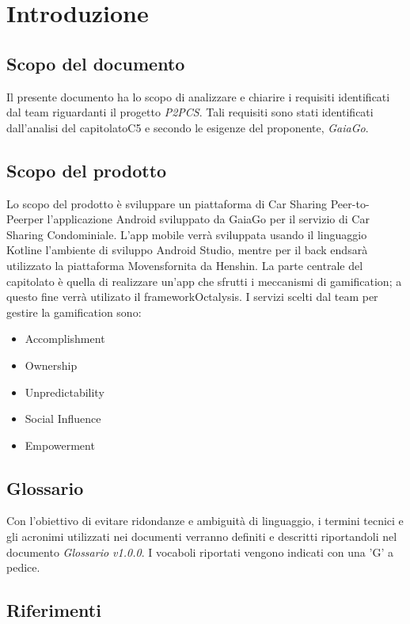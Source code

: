 \section{Introduzione} 
\subsection{Scopo del documento}
Il presente documento ha lo scopo di analizzare e chiarire i requisiti identificati dal team riguardanti il progetto \textit{P2PCS}. Tali requisiti sono stati identificati dall'analisi del capitolato\glosp C5 e secondo le esigenze del proponente, \textit{GaiaGo}.
\subsection{Scopo del prodotto}
Lo scopo del prodotto è sviluppare un piattaforma di Car Sharing Peer-to-Peer\glosp  per l'applicazione Android sviluppato da GaiaGo per il servizio di Car Sharing Condominiale. L'app mobile verrà sviluppata usando il linguaggio Kotlin\glosp e l'ambiente di sviluppo Android Studio, mentre per il back end\glosp sarà utilizzato la piattaforma Movens\glosp fornita da Henshin\glo. La parte centrale del capitolato è quella di realizzare un’app che sfrutti i meccanismi di gamification\glo; a questo fine verrà utilizato il framework\glosp Octalysis\glo. I servizi scelti dal team per gestire la gamification sono:
\begin{itemize}
	\item {Accomplishment}
	\item {Ownership}
	\item {Unpredictability}
	\item {Social Influence}
	\item {Empowerment}
\end{itemize}

\subsection{Glossario}
Con l’obiettivo di evitare ridondanze e ambiguità di linguaggio, i termini tecnici e gli acronimi utilizzati nei documenti verranno definiti e descritti riportandoli nel documento \textit{Glossario v1.0.0}.  I vocaboli riportati vengono indicati con una 'G' a pedice.
\subsection{Riferimenti}
